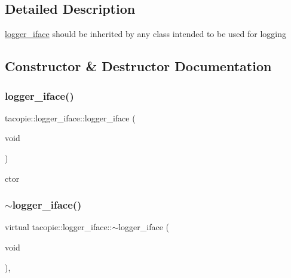 \subsection{Detailed Description}
\hyperlink{classtacopie_1_1logger__iface}{logger\+\_\+iface} should be inherited by any class intended to be used for logging 

\subsection{Constructor \& Destructor Documentation}
\mbox{\label{classtacopie_1_1logger__iface_afccf838f815d168e82e4722e2c4d0d90}} 
\subsubsection{\texorpdfstring{logger\+\_\+iface()}{logger\_iface()}\hspace{0.1cm}{\footnotesize\ttfamily [1/2]}}
{\footnotesize\ttfamily tacopie\+::logger\+\_\+iface\+::logger\+\_\+iface (\begin{DoxyParamCaption}\item[{void}]{ }\end{DoxyParamCaption})\hspace{0.3cm}{\ttfamily [default]}}



ctor 

\mbox{\label{classtacopie_1_1logger__iface_a562dcc605198ca90904ba21fa98eb6ea}} 
\subsubsection{\texorpdfstring{$\sim$logger\+\_\+iface()}{~logger\_iface()}}
{\footnotesize\ttfamily virtual tacopie\+::logger\+\_\+iface\+::$\sim$logger\+\_\+iface (\begin{DoxyParamCaption}\item[{void}]{ }\end{DoxyParamCaption})\hspace{0.3cm}{\ttfamily [virtual]}, {\ttfamily [default]}}



